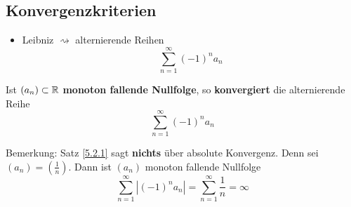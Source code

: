 \subsection{Konvergenzkriterien}
\begin{itemize}
	\item Leibniz $\rightsquigarrow$ alternierende Reihen
		\[ \sum_{n=1}^{\infty} (-1)^n a_n \]
\end{itemize}
\begin{subproposition}[Leibnizkriterium]
	Ist $ (a_n) \subset \mathbb{R} $ \textbf{monoton fallende Nullfolge}, so \textbf{konvergiert} die alternierende Reihe
	\[ \sum_{n=1}^{\infty} (-1)^n a_n \]
\end{subproposition}
Bemerkung:
Satz \ref{5.2.1} sagt \textbf{nichts} über absolute Konvergenz. Denn sei $ (a_n) = \left ( \frac{1}{n} \right ) $. Dann ist $(a_n)$ monoton fallende Nullfolge
\[ \sum_{n = 1}^{\infty} \left| (-1)^n a_n \right| = \sum_{n = 1}^{\infty} \frac{1}{n} = \infty \]
